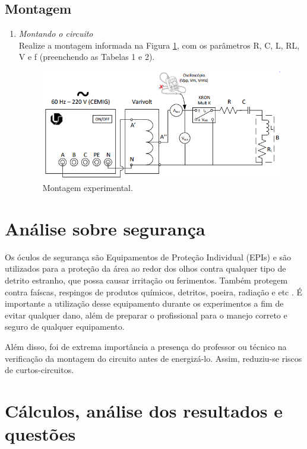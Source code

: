 \documentclass[a4paper,12pt,oneside,openany,table,xcdraw]{article}
\begin{document}
\subsection{Montagem} %

\begin{enumerate}[1)]
\item \emph{Montando o circuito}\\
Realize a montagem informada na Figura \ref{fig1}, com os parâmetros R, C, L, RL, V e f (preenchendo as
Tabelas 1 e 2). 

\begin{figure}[H]
\centering
\captionsetup{font=scriptsize}
\includegraphics[width=11cm]{fig1}
\caption{Montagem experimental.}
\label{fig1}
\end{figure}

\end{enumerate}

\section{Análise sobre segurança} %
Os óculos de segurança são Equipamentos de Proteção Individual (EPIs) e são utilizados para a proteção da área ao redor dos olhos contra qualquer tipo de detrito estranho, que possa causar irritação ou ferimentos. Também protegem contra faíscas, respingos de produtos químicos, detritos, poeira, radiação e etc \cite{safe}.
É importante a utilização desse equipamento durante os experimentos a fim de evitar qualquer dano, além de preparar o profissional para o manejo correto e seguro de qualquer equipamento.

Além disso, foi de extrema importância a presença do professor ou técnico na verificação da montagem do circuito antes de energizá-lo. Assim, reduziu-se riscos de curtos-circuitos.

\section{Cálculos, análise dos resultados e questões} %
\end{document}
